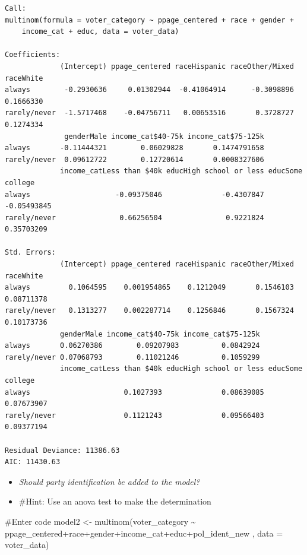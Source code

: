 \documentclass[
  letterpaper,
  DIV=11,
  numbers=noendperiod]{scrartcl}
\newenvironment{Shaded}{\begin{snugshade}}{\end{snugshade}}
\newcommand{\AttributeTok}[1]{\textcolor[rgb]{0.40,0.45,0.13}{#1}}
\newcommand{\CommentTok}[1]{\textcolor[rgb]{0.37,0.37,0.37}{#1}}
\newcommand{\FunctionTok}[1]{\textcolor[rgb]{0.28,0.35,0.67}{#1}}
\newcommand{\NormalTok}[1]{\textcolor[rgb]{0.00,0.23,0.31}{#1}}
\newcommand{\OtherTok}[1]{\textcolor[rgb]{0.00,0.23,0.31}{#1}}
\newcommand{\SpecialCharTok}[1]{\textcolor[rgb]{0.37,0.37,0.37}{#1}}
\providecommand{\tightlist}{%
  \setlength{\itemsep}{0pt}\setlength{\parskip}{0pt}}\usepackage{longtable,booktabs,array}
\begin{document}
\begin{verbatim}
Call:
multinom(formula = voter_category ~ ppage_centered + race + gender + 
    income_cat + educ, data = voter_data)

Coefficients:
             (Intercept) ppage_centered raceHispanic raceOther/Mixed raceWhite
always        -0.2930636     0.01302944  -0.41064914      -0.3098896 0.1666330
rarely/never  -1.5717468    -0.04756711   0.00653516       0.3728727 0.1274334
              genderMale income_cat$40-75k income_cat$75-125k
always       -0.11444321        0.06029828       0.1474791658
rarely/never  0.09612722        0.12720614       0.0008327606
             income_catLess than $40k educHigh school or less educSome college
always                    -0.09375046              -0.4307847      -0.05493845
rarely/never               0.66256504               0.9221824       0.35703209

Std. Errors:
             (Intercept) ppage_centered raceHispanic raceOther/Mixed  raceWhite
always         0.1064595    0.001954865    0.1212049       0.1546103 0.08711378
rarely/never   0.1313277    0.002287714    0.1256846       0.1567324 0.10173736
             genderMale income_cat$40-75k income_cat$75-125k
always       0.06270386        0.09207983          0.0842924
rarely/never 0.07068793        0.11021246          0.1059299
             income_catLess than $40k educHigh school or less educSome college
always                      0.1027393              0.08639085       0.07673907
rarely/never                0.1121243              0.09566403       0.09377194

Residual Deviance: 11386.63 
AIC: 11430.63 
\end{verbatim}

\begin{itemize}
\tightlist
\item
  \emph{Should party identification be added to the model?}
\item
  \#Hint: Use an anova test to make the determination
\end{itemize}

\begin{Shaded}
\begin{Highlighting}[]
\CommentTok{\#Enter code}
\NormalTok{    model2 }\OtherTok{\textless{}{-}} \FunctionTok{multinom}\NormalTok{(voter\_category }\SpecialCharTok{\textasciitilde{}}\NormalTok{ ppage\_centered}\SpecialCharTok{+}\NormalTok{race}\SpecialCharTok{+}\NormalTok{gender}\SpecialCharTok{+}\NormalTok{income\_cat}\SpecialCharTok{+}\NormalTok{educ}\SpecialCharTok{+}\NormalTok{pol\_ident\_new , }\AttributeTok{data =}\NormalTok{ voter\_data) }
\end{Highlighting}
\end{Shaded}
\end{document}
